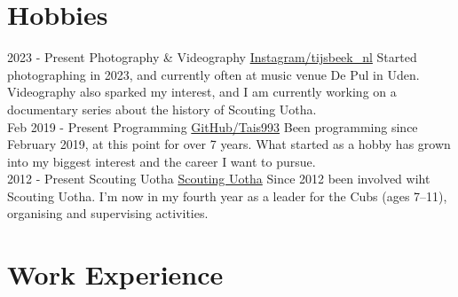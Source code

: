 \documentclass[letterpaper]{twentysecondcv_english}
\begin{document}
    \section{Hobbies}

    \begin{twenty}

        \twentyitem
        {2023 -}
        {Present}
        {Photography \& Videography}
        {\href{https://www.instagram.com/tijsbeek_nl/}{Instagram/tijsbeek\_nl}}
        {}
        {
            Started photographing in 2023, and currently often at
        music venue De Pul in Uden.
        Videography also sparked my interest, and I am currently working on a documentary series
        about the history of Scouting Uotha.
        } \\

        \twentyitem
        {Feb 2019 -}
        {Present}
        {Programming}
        {\href{https://github.com/Tais993}{GitHub/Tais993}}
        {}
        {
            Been programming since February 2019, at this point for over 7 years.
            What started as a hobby has grown into my biggest interest
            and the career I want to pursue.
        } \\

        \twentyitem
        {2012 -}
        {Present}
        {Scouting Uotha}
        {\href{https://www.uotha.nl/}{Scouting Uotha}}
        {}
        {
            Since 2012 been involved wiht Scouting Uotha.
            I'm now in my fourth year as a leader for the Cubs
            (ages 7--11), organising and supervising activities.
        }

    \end{twenty}

    \vspace{6mm}



    \section{Work Experience}
\end{document}
